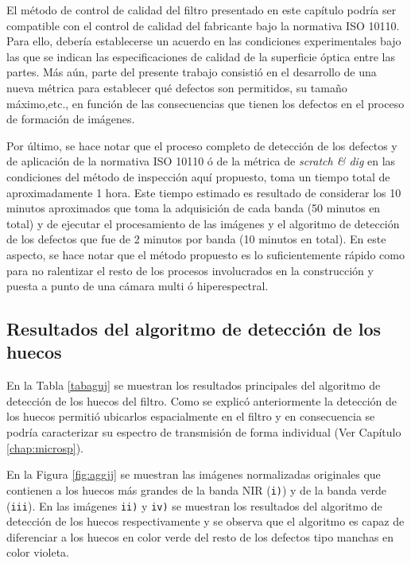 El método de control de calidad del filtro presentado en este capítulo podría ser compatible con el control de calidad del fabricante bajo la normativa ISO 10110. Para ello, debería establecerse un acuerdo en las condiciones experimentales bajo las que se indican las especificaciones de calidad de la superficie óptica entre las partes. Más aún, parte del presente trabajo consistió en el desarrollo de una nueva métrica para establecer qué defectos son permitidos, su tamaño máximo,etc., en función de las consecuencias que tienen los defectos en el proceso de formación de imágenes.

Por último, se hace notar que el proceso completo de detección de los defectos y de aplicación de la normativa ISO 10110 ó de la métrica de \textit{scratch \& dig} en las condiciones del método de inspección aquí propuesto, toma un tiempo total de aproximadamente 1 hora. Este tiempo estimado es resultado de considerar los 10 minutos aproximados que toma la adquisición de cada banda (50 minutos en total) y de ejecutar el procesamiento de las imágenes y el algoritmo de detección de los defectos que fue de 2 minutos por banda (10 minutos en total). En este aspecto, se hace notar que el método propuesto es lo suficientemente rápido como para no ralentizar el resto de los procesos involucrados en la construcción y puesta a punto de una cámara multi ó  hiperespectral.


\singlespacing
\subsection{Resultados del algoritmo de detección de los huecos}
\label{sec:aguj}

\hspace{0.5cm} En la Tabla \ref{tabaguj} se muestran los resultados principales del algoritmo de detección de los huecos del filtro. Como se explicó anteriormente la detección de los huecos permitió ubicarlos espacialmente en el filtro y en consecuencia se podría caracterizar su espectro de transmisión de forma individual (Ver Capítulo \ref{chap:microsp}).

En la Figura \ref{fig:aggjj} se muestran las imágenes normalizadas originales que contienen a los huecos más grandes de la banda NIR (\texttt{i)}) y de la banda verde (\texttt{iii}). En las imágenes \texttt{ii)} y \texttt{iv)} se muestran los resultados del algoritmo de detección de los huecos respectivamente y se observa que el algoritmo es capaz de diferenciar a los huecos en color verde del resto de los defectos tipo manchas en color violeta.

